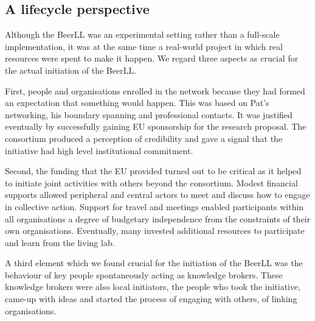 \documentclass[graybox]{styles/svmult}
\begin{document}
\subsection{A lifecycle perspective}
Although the BeerLL was an experimental setting rather than a full-scale implementation, it was at the same time a real-world project in which real resources were spent to make it happen. We regard three aspects as crucial for the actual initiation of the BeerLL. 

First, people and organisations enrolled in the network because they had formed an expectation that something would happen. This was based on Pat's networking, his boundary spanning and professional contacts. It was justified eventually by successfully gaining EU sponsorship for the research proposal. The consortium produced a perception of credibility and gave a signal that the initiative had high level institutional commitment. 

Second, the funding that the EU provided turned out to be critical as it helped to initiate joint activities with others beyond the consortium. Modest financial supports allowed peripheral and central actors to meet and discuss how to engage in collective action. Support for travel and meetings enabled participants within all organisations a degree of budgetary independence from the constraints of their own organisations. Eventually, many invested additional resources to participate and learn from the living lab. 

A third element which we found crucial for the initiation of the BeerLL was the behaviour of key people spontaneously acting as knowledge brokers. These knowledge brokers were also local initiators, the people who took the initiative, came-up with ideas and started the process of engaging with others, of linking organisations.
\end{document}
